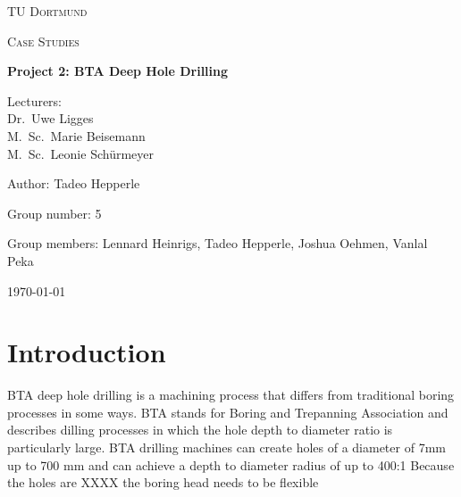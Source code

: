 \documentclass[12 pt]{scrartcl}
\begin{document}
\begin{titlepage}
  \centering
  {\scshape\LARGE TU Dortmund \par}
  \vspace{1cm}
  {\scshape\Large Case Studies \par}
  \vspace{2cm}
  {\huge\bfseries Project 2: BTA Deep Hole Drilling\par}
  \vspace{2cm}
  {\Large Lecturers:\\
    Dr.\ Uwe Ligges \\
    M.\ Sc.\ Marie Beisemann\\
    M.\ Sc.\ Leonie Schürmeyer \par}
  \vspace{1cm}
  {\Large Author: Tadeo Hepperle \par}
  \vspace{0.5 cm}
  {\Large Group number: 5\par}
  \vspace{0.5 cm}
  {\Large Group members: Lennard Heinrigs, Tadeo Hepperle, Joshua Oehmen, Vanlal Peka}
  \vfill
  {\large \today\par}
\end{titlepage}

\tableofcontents

\cleardoublepage

\section{Introduction}


BTA deep hole drilling is a machining process that differs from traditional boring processes in some ways.
BTA stands for Boring and Trepanning Association and describes dilling processes in which the hole depth to diameter ratio is particularly large. BTA drilling machines can create holes of a diameter of 7mm up to 700 mm and can achieve a depth to diameter radius of up to 400:1
Because the holes are XXXX the boring head needs to be flexible



\end{document}
